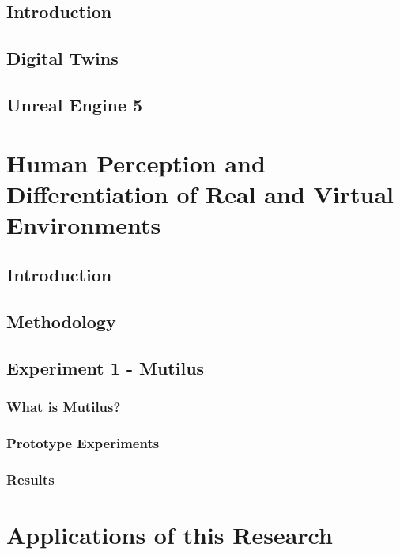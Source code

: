 \documentclass[12pt]{article}
\begin{document}
\subsection{Introduction}

\subsection{Digital Twins}

\subsection{Unreal Engine 5}

\section{Human Perception and Differentiation of Real and Virtual Environments}

\subsection{Introduction}

\subsection{Methodology}

\subsection{Experiment 1 - Mutilus}

\subsubsection{What is Mutilus?}

\subsubsection{Prototype Experiments}



\subsubsection{Results}

\section{Applications of this Research}
\end{document}
